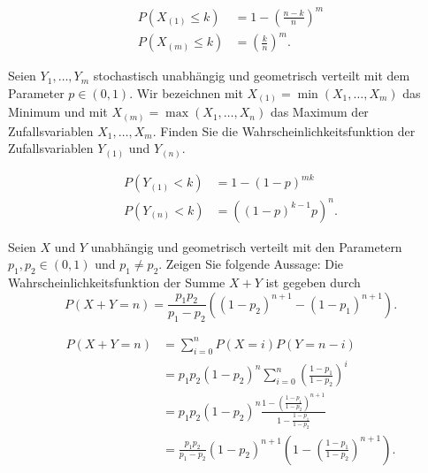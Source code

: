 \solution
\begin{align*}
    P\left( X_{(1)} \leq k \right) &= 1 - \left( \frac{n-k}{n} \right)^m \\
    P\left( X_{(m)} \leq k \right) &= \left( \frac{k}{n} \right)^{m}. 
\end{align*}


 Seien $Y_1,\dots ,Y_m$
stochastisch unabhängig und geometrisch verteilt mit dem Parameter $p\in(0,1)$.
Wir bezeichnen mit $X_{(1)} = \min (X_1,\dots ,X_m)$ das Minimum und mit
$X_{(m)} = \max \left( X_1,\dots ,X_n \right)$ das Maximum der Zufallsvariablen
$X_1,\dots ,X_m$.  Finden Sie die Wahrscheinlichkeitsfunktion der
Zufallsvariablen $Y_{(1)}$ und $Y_{(n)}$.

\solution
\begin{align*}
    P\left( Y_{(1)} < k \right) &= 1 - \left( 1-p \right)^{mk} \\
    P\left( Y_{(n)} < k \right) &= \left( \left( 1-p \right)^{k-1} p \right)^n.
\end{align*}


 Seien $X$ und $Y$ unabhängig und geometrisch
verteilt mit den Parametern $p_1, p_2 \in (0,1)$ und $p_1\neq p_2$. Zeigen Sie folgende Aussage: 
Die Wahrscheinlichkeitsfunktion der Summe $X+Y$ ist gegeben durch
\begin{equation*}
    P(X+Y = n ) = \frac{p_1 p_2}{p_1 - p_2} \left( (1-p_2)^{n+1}- (1-p_1)^{n+1} \right).  
\end{equation*}

\solution 
\begin{align*}
    P( X+Y = n) &= \sum_{i=0}^{n} P(X=i)P(Y=n-i) \\
    &= p_1 p_2 (1-p_2)^n \sum_{i=0}^{n} \left( \frac{1-p_1}{1-p_2} \right)^{i} \\
    &=  p_1 p_2 (1-p_2)^n \frac{1 - \left( \frac{1-p_1}{1-p_2} \right)^{n+1}}{ 1- \frac{1-p_1}{1-p_2}} \\
    &= \frac{p_1 p_2}{ p_1 -p_2} (1-p_2)^{n+1}\left( 1 - \left( \frac{1-p_1}{1-p_2} \right)^{n+1} \right).
\end{align*}



